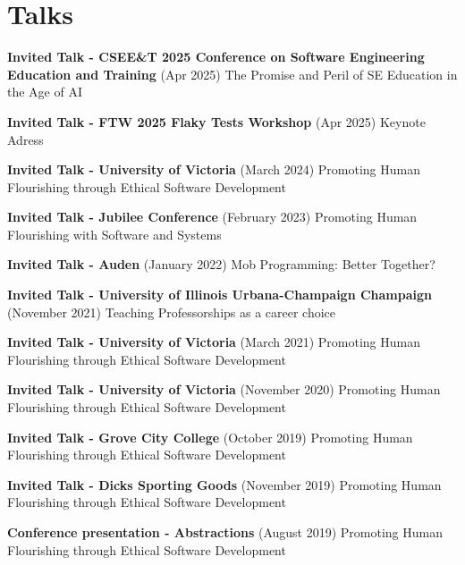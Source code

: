 \documentclass[10pt]{article}
\begin{document}
\section{Talks}
\begin{bibsection}
\setlength\itemsep{2pt}
\item \textbf{Invited Talk - CSEE\&T 2025 Conference on Software Engineering Education and Training} (Apr 2025) The Promise and Peril of SE Education in the Age of AI
\item \textbf{Invited Talk - FTW 2025 Flaky Tests Workshop} (Apr 2025) Keynote Adress
\item \textbf{Invited Talk - University of Victoria} (March 2024) Promoting Human Flourishing through Ethical Software Development 
\item \textbf{Invited Talk - Jubilee Conference } (February 2023) Promoting Human Flourishing with Software and Systems 
\item \textbf{Invited Talk - Auden } (January 2022) Mob Programming: Better Together? 
\item \textbf{Invited Talk - University of Illinois Urbana-Champaign
Champaign} (November 2021) Teaching Professorships as a career choice
\item \textbf{Invited Talk - University of Victoria} (March 2021) Promoting Human Flourishing through Ethical Software Development 
\item \textbf{Invited Talk - University of Victoria} (November 2020) Promoting Human Flourishing through Ethical Software Development 
\item \textbf{Invited Talk - Grove City College} (October 2019) Promoting Human Flourishing through Ethical Software Development 
\item \textbf{Invited Talk - Dicks Sporting Goods } (November 2019) Promoting Human Flourishing through Ethical Software Development 
\item \textbf{Conference presentation - Abstractions} (August 2019) Promoting Human Flourishing through Ethical Software Development 

\end{bibsection}

\vspace{10pt}





%
%
\end{document}
